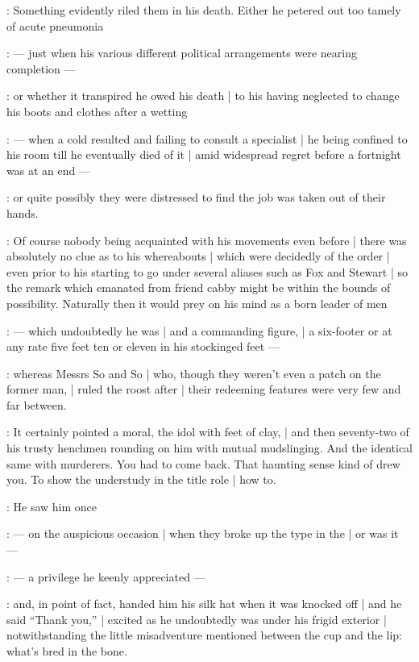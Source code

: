 :
Something evidently riled them in his death.
Either he petered out too tamely of acute pneumonia

:
    --- just when his various different political arrangements were nearing completion ---

:
or whether it transpired he owed his death |
to his having neglected to change his boots and clothes after a wetting

:
    --- when a cold resulted and failing to consult a specialist |
        he being confined to his room till he eventually died of it |
        amid widespread regret before a fortnight was at an end ---

:
or quite possibly they were distressed to find the job was taken out of their hands.

:
Of course nobody being acquainted with his movements even before |
there was absolutely no clue as to his whereabouts |
which were decidedly of the  order |
even prior to his starting to go under several aliases such as Fox and Stewart |
so the remark which emanated from friend cabby might be within the bounds of possibility.
Naturally then it would prey on his mind as a born leader of men

:
    --- which undoubtedly he was |
        and a commanding figure, |
        a six-footer or at any rate five feet ten or eleven in his stockinged feet ---

:
whereas Messrs So and So |
who, though they weren't even a patch on the former man, |
ruled the roost after |
their redeeming features were very few and far between.

:
It certainly pointed a moral, the idol with feet of clay, |
and then seventy-two of his trusty henchmen rounding on him with mutual mudslinging.
And the identical same with murderers.
You had to come back.
That haunting sense kind of drew you.
To show the understudy in the title role |
how to.

:
He saw him once

:
    --- on the auspicious occasion |
        when they broke up the type in the  |
        or was it  ---

:
    --- a privilege he keenly appreciated ---

:
and, in point of fact, handed him his silk hat when it was knocked off |
and he said ``Thank you,'' |
excited as he undoubtedly was under his frigid exterior |
notwithstanding the little misadventure
mentioned between the cup and the lip:
what's bred in the bone.

